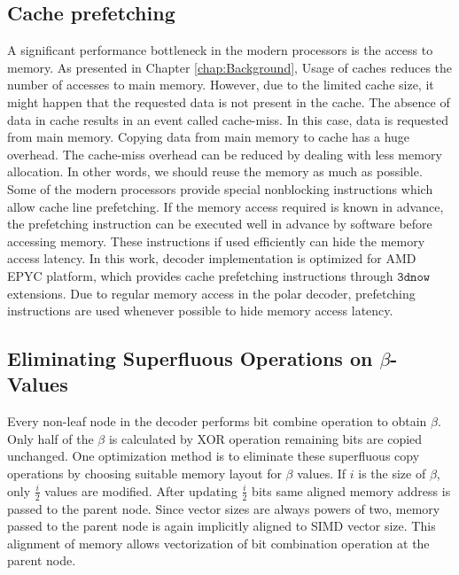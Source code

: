 \subsection{Cache prefetching}
A significant performance bottleneck in the modern processors is the access to memory. As presented in Chapter \ref{chap:Background}, Usage of caches reduces the number of accesses to main memory. However, due to the limited cache size, it might happen that the requested data is not present in the cache. The absence of data in cache results in an event called cache-miss. In this case, data is requested from main memory. Copying data from main memory to cache has a huge overhead.  The cache-miss overhead can be reduced by dealing with less memory allocation. In other words, we should reuse the memory as much as possible. Some of the modern processors provide special nonblocking instructions which allow cache line prefetching. If the memory access required is known in advance, the prefetching instruction can be executed well in advance by software before accessing memory. These instructions if used efficiently can hide the memory access latency. In this work, decoder implementation is optimized for AMD EPYC platform, which provides cache prefetching instructions through $ \mathtt{3dnow} $ extensions. Due to regular memory access in the polar decoder, prefetching instructions are used whenever possible to hide memory access latency.

\subsection {Eliminating Superfluous Operations on $\beta$-Values}
Every non-leaf node in the decoder performs bit combine operation to obtain $\beta$. Only half of the $\beta$ is calculated by XOR operation remaining bits are copied unchanged. One optimization method is to eliminate these superfluous copy operations by choosing suitable memory layout for $\beta$ values. If $i$ is the size of $\beta$, only $\frac{i}{2}$ values are modified. After updating $\frac{i}{2}$ bits same aligned memory address is passed to the parent node. Since vector sizes are always powers of two, memory passed to the parent node is again implicitly aligned to SIMD vector size. This alignment of memory allows vectorization of bit combination operation at the parent node.

